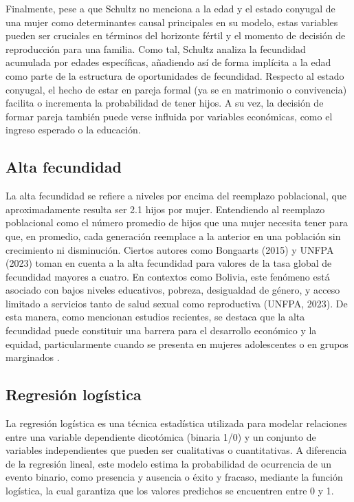\documentclass[Royal,times,sageh]{sagej}
\begin{document}
Finalmente, pese a que Schultz no menciona a la edad y el estado
conyugal de una mujer como determinantes causal principales en su
modelo, estas variables pueden ser cruciales en términos del horizonte
fértil y el momento de decisión de reproducción para una familia. Como
tal, Schultz analiza la fecundidad acumulada por edades específicas,
añadiendo así de forma implícita a la edad como parte de la estructura
de oportunidades de fecundidad. Respecto al estado conyugal, el hecho de
estar en pareja formal (ya se en matrimonio o convivencia) facilita o
incrementa la probabilidad de tener hijos. A su vez, la decisión de
formar pareja también puede verse influida por variables económicas,
como el ingreso esperado o la educación.

\subsection{Alta fecundidad}\label{alta-fecundidad}

La alta fecundidad se refiere a niveles por encima del reemplazo
poblacional, que aproximadamente resulta ser 2.1 hijos por mujer.
Entendiendo al reemplazo poblacional como el número promedio de hijos
que una mujer necesita tener para que, en promedio, cada generación
reemplace a la anterior en una población sin crecimiento ni disminución.
Ciertos autores como Bongaarts (2015) y UNFPA (2023) toman en cuenta a
la alta fecundidad para valores de la tasa global de fecundidad mayores
a cuatro. En contextos como Bolivia, este fenómeno está asociado con
bajos niveles educativos, pobreza, desigualdad de género, y acceso
limitado a servicios tanto de salud sexual como reproductiva (UNFPA,
2023). De esta manera, como mencionan estudios recientes, se destaca que
la alta fecundidad puede constituir una barrera para el desarrollo
económico y la equidad, particularmente cuando se presenta en mujeres
adolescentes o en grupos marginados \citep{binstock2014entornos}.

\subsection{Regresión logística}\label{regresiuxf3n-loguxedstica}

La regresión logística es una técnica estadística utilizada para modelar
relaciones entre una variable dependiente dicotómica (binaria 1/0) y un
conjunto de variables independientes que pueden ser cualitativas o
cuantitativas. A diferencia de la regresión lineal, este modelo estima
la probabilidad de ocurrencia de un evento binario, como presencia y
ausencia o éxito y fracaso, mediante la función logística, la cual
garantiza que los valores predichos se encuentren entre 0 y 1.
\end{document}
